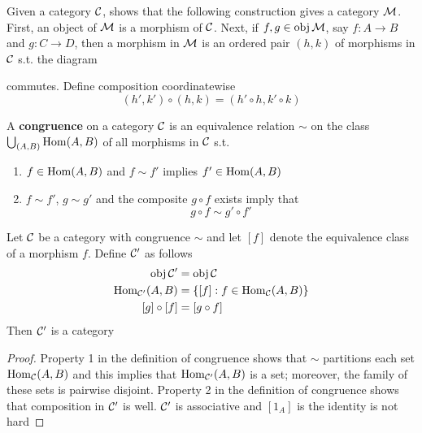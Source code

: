 \documentclass[11pt]{article}
\begin{document}
\begin{exercise}
\label{ex0.12}
Given a category \(\mathcal{C}\), shows that the following construction gives a category \(\mathcal{M}\). First, an
object of \(\mathcal{M}\) is a morphism of \(\mathcal{C}\). Next, if \(f,g\in\operatorname{obj}\mathcal{M}\), say \(f:A\to B\) and \(g:C\to D\),
then a morphism in \(\mathcal{M}\) is an ordered pair \((h,k)\) of morphisms in \(\mathcal{C}\) s.t. the diagram
\begin{center}\end{center}
commutes. Define composition coordinatewise
\begin{equation*}
(h',k')\circ(h,k)=(h'\circ h,k'\circ k)
\end{equation*}
\end{exercise}

\begin{definition}[]
A \textbf{congruence} on a category \(\mathcal{C}\) is an equivalence relation \(\sim\) on the
class \(\bigcup_{(A,B)}\operatorname{Hom}(A,B)\) of all morphisms in \(\mathcal{C}\) s.t.
\begin{enumerate}
\item \(f\in\operatorname{Hom}(A,B)\) and \(f\sim f'\) implies \(f'\in\operatorname{Hom}(A,B)\)
\item \(f\sim f'\), \(g\sim g'\) and the composite \(g\circ f\) exists imply that
\begin{equation*}
g\circ f\sim g'\circ f'
\end{equation*}
\end{enumerate}
\end{definition}

\begin{theorem}[]
\label{thm0.4}
Let \(\mathcal{C}\) be a category with congruence \(\sim\) and let \([f]\) denote the equivalence class of a
morphism \(f\). Define \(\mathcal{C}'\) as follows
\begin{align*}
\operatorname{obj}\mathcal{C}'&=\operatorname{obj}\mathcal{C}\\
\operatorname{Hom}_{\mathcal{C}'}(A,B)&=\{[f]:f\in\operatorname{Hom}_{\mathcal{C}}(A,B)\}\\
[g]\circ[f]&=[g\circ f]
\end{align*}
Then \(\mathcal{C}'\) is a category
\end{theorem}

\begin{proof}
Property 1 in the definition of congruence shows that \(\sim\) partitions each set \(\operatorname{Hom}_{\mathcal{C}}(A,B)\)
and this implies that \(\operatorname{Hom}_{\mathcal{C}'}(A,B)\) is a set; moreover, the family of these sets is pairwise
disjoint. Property 2 in the definition of congruence shows that composition in \(\mathcal{C}'\) is
well. \(\mathcal{C}'\) is associative and \([1_A]\) is the identity is not hard
\end{proof}
\end{document}
